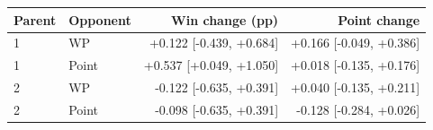 \begin{tabular}{llrr}
\toprule
Parent & Opponent & Win change (pp) & Point change \\
\midrule
1 & WP & +0.122 [-0.439, +0.684] & +0.166 [-0.049, +0.386] \\
1 & Point & +0.537 [+0.049, +1.050] & +0.018 [-0.135, +0.176] \\
2 & WP & -0.122 [-0.635, +0.391] & +0.040 [-0.135, +0.211] \\
2 & Point & -0.098 [-0.635, +0.391] & -0.128 [-0.284, +0.026] \\
\bottomrule
\end{tabular}
